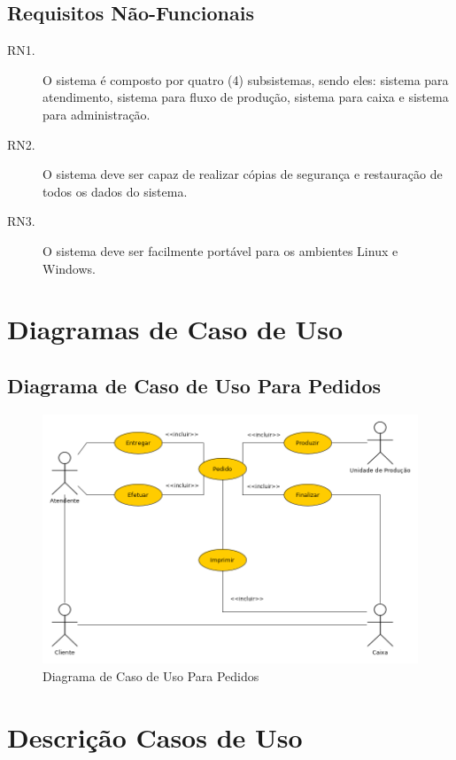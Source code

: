 \documentclass[article, 12pt, oneside, a4paper, brazil]{abntex2}
\begin{document}
 \subsection{Requisitos Não-Funcionais}
 \begin{description}
  \item [RN1.] O sistema é composto por quatro (4) subsistemas, sendo eles: sistema para atendimento, sistema para fluxo de produção, sistema para caixa e sistema para administração.
  \item [RN2.] O sistema deve ser capaz de realizar cópias de segurança e restauração de todos os dados do sistema.
  \item [RN3.] O sistema deve ser facilmente portável para os ambientes Linux e Windows.
 \end{description}

  \pagebreak
 
 \section{Diagramas de Caso de Uso}
 \subsection{Diagrama de Caso de Uso Para Pedidos}
 \begin{figure}[!htb]
 \caption{Diagrama de Caso de Uso Para Pedidos}
 \begin{center}
 \includegraphics[width=\textwidth]{images/pedidos001.png}
 \end{center}
 \end{figure}
 
 \section{Descrição Casos de Uso}
 
\end{document}
